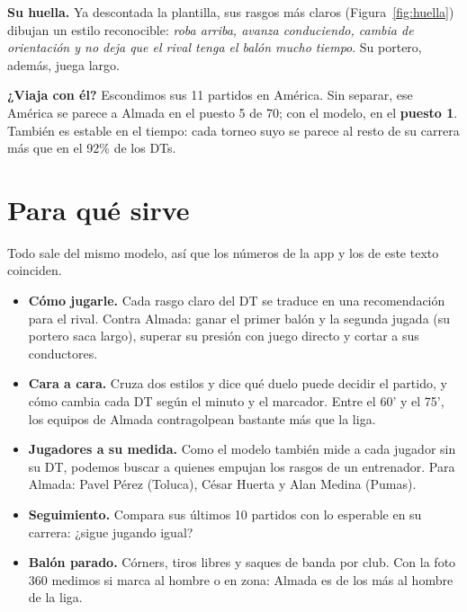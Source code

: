 \documentclass[10pt,a4paper,twocolumn]{article}
\begin{document}
\textbf{Su huella.} Ya descontada la plantilla, sus rasgos más claros (Figura~\ref{fig:huella}) dibujan un estilo reconocible: \emph{roba arriba, avanza conduciendo, cambia de orientación y no deja que el rival tenga el balón mucho tiempo}. Su portero, además, juega largo.

\textbf{¿Viaja con él?} Escondimos sus 11 partidos en América. Sin separar, ese América se parece a Almada en el puesto 5 de 70; con el modelo, en el \textbf{puesto 1}. También es estable en el tiempo: cada torneo suyo se parece al resto de su carrera más que en el 92\% de los DTs.

\section{Para qué sirve}
Todo sale del mismo modelo, así que los números de la app y los de este texto coinciden.
\begin{itemize}
\item \textbf{Cómo jugarle.} Cada rasgo claro del DT se traduce en una recomendación para el rival. Contra Almada: ganar el primer balón y la segunda jugada (su portero saca largo), superar su presión con juego directo y cortar a sus conductores.
\item \textbf{Cara a cara.} Cruza dos estilos y dice qué duelo puede decidir el partido, y cómo cambia cada DT según el minuto y el marcador. Entre el 60' y el 75', los equipos de Almada contragolpean bastante más que la liga.
\item \textbf{Jugadores a su medida.} Como el modelo también mide a cada jugador sin su DT, podemos buscar a quienes empujan los rasgos de un entrenador. Para Almada: Pavel Pérez (Toluca), César Huerta y Alan Medina (Pumas).
\item \textbf{Seguimiento.} Compara sus últimos 10 partidos con lo esperable en su carrera: ¿sigue jugando igual?
\item \textbf{Balón parado.} Córners, tiros libres y saques de banda por club. Con la foto 360 medimos si marca al hombre o en zona: Almada es de los más al hombre de la liga.
\end{itemize}

\end{document}
